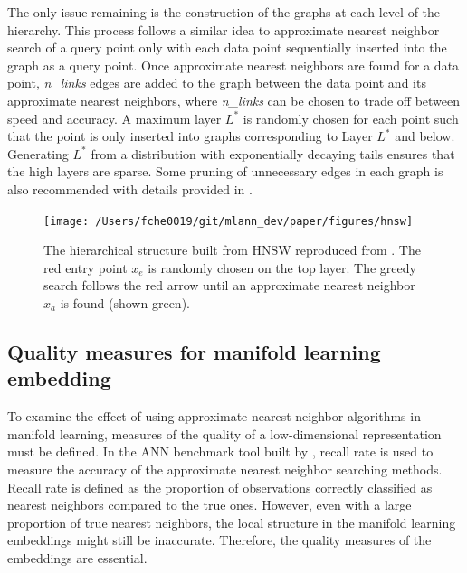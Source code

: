 \documentclass[11pt,a4paper,]{article}
\begin{document}
The only issue remaining is the construction of the graphs at each level of the hierarchy. This process follows a similar idea to approximate nearest neighbor search of a query point only with each data point sequentially inserted into the graph as a query point. Once approximate nearest neighbors are found for a data point, \textit{n\_links} edges are added to the graph between the data point and its approximate nearest neighbors, where \textit{n\_links} can be chosen to trade off between speed and accuracy. A maximum layer \(L^*\) is randomly chosen for each point such that the point is only inserted into graphs corresponding to Layer \(L^*\) and below. Generating \(L^*\) from a distribution with exponentially decaying tails ensures that the high layers are sparse. Some pruning of unnecessary edges in each graph is also recommended with details provided in \textcite{Malkov2020-jp}.



\begin{figure}

{\centering \texttt{[image: /Users/fche0019/git/mlann\_dev/paper/figures/hnsw]} 

}

\caption{The hierarchical structure built from HNSW reproduced from \textcite{Malkov2020-jp}. The red entry point \(x_e\) is randomly chosen on the top layer. The greedy search follows the red arrow until an approximate nearest neighbor \(x_a\) is found (shown green).}\label{fig:hnsw}
\end{figure}

\hypertarget{qualitymeasure}{%
\subsection{Quality measures for manifold learning embedding}\label{qualitymeasure}}

To examine the effect of using approximate nearest neighbor algorithms in manifold learning, measures of the quality of a low-dimensional representation must be defined.
In the ANN benchmark tool built by \textcite{Aumuller2020-nk}, recall rate is used to measure the accuracy of the approximate nearest neighbor searching methods. Recall rate is defined as the proportion of observations correctly classified as nearest neighbors compared to the true ones. However, even with a large proportion of true nearest neighbors, the local structure in the manifold learning embeddings might still be inaccurate. Therefore, the quality measures of the embeddings are essential.
\end{document}
